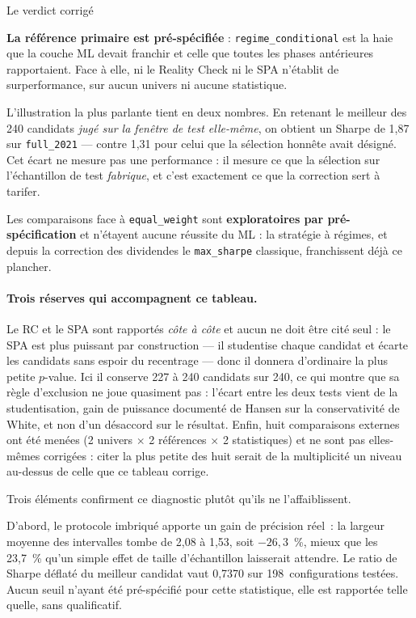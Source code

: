 \begin{resultatbox}{Le verdict corrigé}
\correctionVerdict{}

\textbf{La référence primaire est pré-spécifiée} : \texttt{regime\_conditional}
est la haie que la couche ML devait franchir et celle que toutes les phases
antérieures rapportaient. Face à elle, ni le Reality Check ni le SPA n'établit
de surperformance, sur aucun univers ni aucune statistique.

L'illustration la plus parlante tient en deux nombres. En retenant le meilleur
des 240 candidats \emph{jugé sur la fenêtre de test elle-même}, on obtient un
Sharpe de 1,87 sur \texttt{full\_2021} — contre 1,31 pour celui que la
sélection honnête avait désigné. Cet écart ne mesure pas une performance : il
mesure ce que la sélection sur l'échantillon de test \emph{fabrique}, et c'est
exactement ce que la correction sert à tarifer.

Les comparaisons face à \texttt{equal\_weight} sont \textbf{exploratoires par
pré-spécification} et n'étayent aucune réussite du ML : la stratégie à régimes,
et depuis la correction des dividendes le \texttt{max\_sharpe} classique,
franchissent déjà ce plancher.
\end{resultatbox}

\paragraph{Trois réserves qui accompagnent ce tableau.} Le RC et le SPA sont
rapportés \emph{côte à côte} et aucun ne doit être cité seul : le SPA est plus
puissant par construction — il studentise chaque candidat et écarte les
candidats sans espoir du recentrage — donc il donnera d'ordinaire la plus
petite $p$-value. Ici il conserve 227 à 240 candidats sur 240, ce qui montre que
sa règle d'exclusion ne joue quasiment pas : l'écart entre les deux tests vient
de la studentisation, gain de puissance documenté de Hansen sur la
conservativité de White, et non d'un désaccord sur le résultat. Enfin, huit
comparaisons externes ont été menées (2 univers $\times$ 2 références $\times$ 2
statistiques) et ne sont pas elles-mêmes corrigées : citer la plus petite des
huit serait de la multiplicité un niveau au-dessus de celle que ce tableau
corrige.


Trois éléments confirment ce diagnostic plutôt qu'ils ne l'affaiblissent.

D'abord, le protocole imbriqué apporte un gain de précision réel~: la largeur
moyenne des intervalles tombe de 2,08 à 1,53, soit $-26{,}3$~\%, mieux que les
23,7~\% qu'un simple effet de taille d'échantillon laisserait attendre. Le ratio
de Sharpe déflaté du meilleur candidat vaut 0,7370 sur 198~configurations
testées. Aucun seuil n'ayant été pré-spécifié pour cette statistique, elle est
rapportée telle quelle, sans qualificatif.

